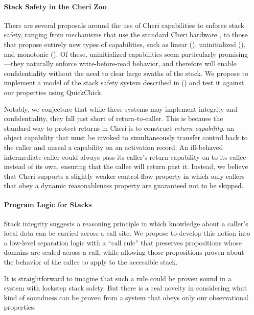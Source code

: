 \documentclass[acmsmall,review,anonymous]{acmart}\settopmatter{printfolios=true,printccs=false,printacmref=false}
\begin{document}
\paragraph*{Stack Safety in the Cheri Zoo}

There are several proposals around the use of Cheri capabilities to enforce stack safety,
ranging from mechanisms that use the standard Cheri hardware \citep{Skorstengaard+19b},
to those that propose entirely new types of capabilities, such as linear
(\citep{Skorstengaard+19}), uninitialized (\citep{Georges+21}), and monotonic ().
Of these, uninitialized capabilities seem particularly promising---they naturally enforce
write-before-read behavior, and therefore will enable confidentiality without the need
to clear large swaths of the stack. We propose to implement a model of the stack safety
system described in (\citep{Georges+21}) and test it against our properties using
QuickChick.

Notably, we conjecture that while these systems may implement integrity and confidentiality,
they fall just short of return-to-caller. This is because the standard way to protect returns
in Cheri is to construct {\em return capability}, an object capability that must be invoked
to simultaneously transfer control back to the caller and unseal a capability on an activation
record. An ill-behaved intermediate caller could always pass its caller's return capability on
to its callee instead of its own, ensuring that the callee will return past it. Instead,
we believe that Cheri supports a slightly weaker control-flow property in which only callers
that obey a dynamic reasonableness property are guaranteed not to be skipped.

\paragraph*{Program Logic for Stacks}

Stack integrity suggests a reasoning principle in which knowledge about a caller's
local data can be carried across a call site. We propose to develop this notion
into a low-level separation logic with a ``call rule'' that preserves propositions
whose domains are sealed across a call, while allowing those propositions proven
about the behavior of the callee to apply to the accessible stack.

It is straightforward to imagine that such a rule could be proven sound in a
system with lockstep stack safety. But there is a real novelty in considering
what kind of soundness can be proven from a system that obeys only our observational
properties.
\end{document}
